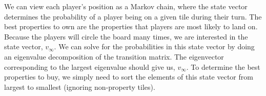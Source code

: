 \documentclass[fleqn]{article}
\begin{document}
\begin{enumerate}[nolistsep]
\begin{enumerate}
			We can view each player's position as a Markov chain, where the state vector determines the probability of a player being on a given tile during their turn. The best properties to own are the properties that players are most likely to land on. Because the players will circle the board many times, we are interested in the state vector, $v_{\infty}$. We can solve for the probabilities in this state vector by doing an eigenvalue decomposition of the transition matrix. The eigenvector corresponding to the largest eigenvalue should give us, $v_\infty$. To determine the best properties to buy, we simply need to sort the elements of this state vector from largest to smallest (ignoring non-property tiles).
		\end{enumerate}
	\end{enumerate}
\end{document}
